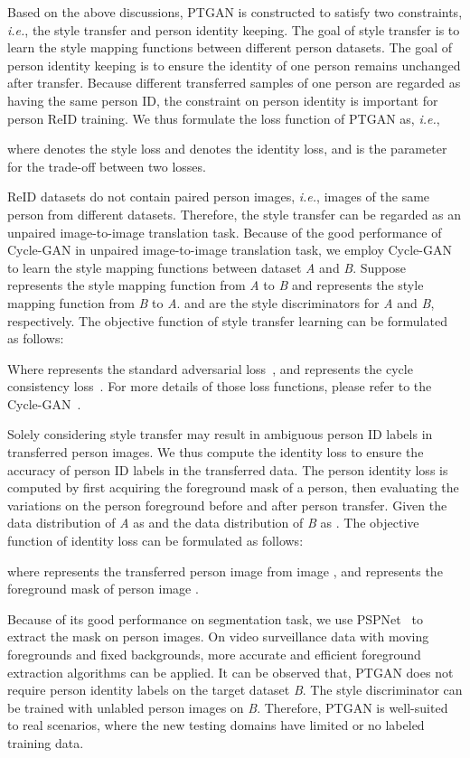 \documentclass[10pt,twocolumn,letterpaper]{article}
\begin{document}
Based on the above discussions, PTGAN is constructed to satisfy two constraints, \emph{i.e.}, the style transfer and person identity keeping. The goal of style transfer is to learn the style mapping functions between different person datasets. The goal of person identity keeping is to ensure the identity of one person remains unchanged after transfer. Because different transferred samples of one person are regarded as having the same person ID, the constraint on person identity is important for person ReID training. We thus formulate the loss function of PTGAN as, \emph{i.e.},

where  denotes the style loss and  denotes the identity loss, and  is the parameter for the trade-off between two losses.

ReID datasets do not contain paired person images, \emph{i.e.}, images of the same person from different datasets. Therefore, the style transfer can be regarded as an unpaired image-to-image translation task. Because of the good performance of Cycle-GAN in unpaired image-to-image translation task, we employ Cycle-GAN to learn the style mapping functions between dataset \emph{A} and \emph{B}. Suppose  represents the style mapping function from \emph{A} to \emph{B} and  represents the style mapping function from \emph{B} to \emph{A}.  and  are the style discriminators for \emph{A} and \emph{B}, respectively. The objective function of style transfer learning can be formulated as follows:

Where  represents the standard adversarial loss~\cite{goodfellow2014generative}, and  represents the cycle consistency loss~\cite{zhu2017unpaired}. For more details of those loss functions, please refer to the Cycle-GAN~\cite{zhu2017unpaired}.

Solely considering style transfer may result in ambiguous person ID labels in transferred person images. We thus compute the identity loss to ensure the accuracy of person ID labels in the transferred data. The person identity loss is computed by first acquiring the foreground mask of a person, then evaluating the variations on the person foreground before and after person transfer. Given the data distribution of \emph{A} as  and the data distribution of \emph{B} as . The objective function of identity loss can be formulated as follows:

where  represents the transferred person image from image , and  represents the foreground mask of person image .

Because of its good performance on segmentation task, we use PSPNet~\cite{zhao2017pspnet} to extract the mask on person images. On video surveillance data with moving foregrounds and fixed backgrounds, more accurate and efficient foreground extraction algorithms can be applied. It can be observed that, PTGAN does not require person identity labels on the target dataset \emph{B}. The style discriminator  can be trained with unlabled person images on \emph{B}. Therefore, PTGAN is well-suited to real scenarios, where the new testing domains have limited or no labeled training data.
\end{document}

